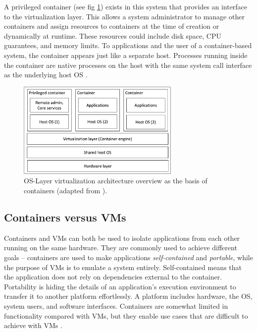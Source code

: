 A privileged container (see fig \ref{fig:OS-Layer-virtualization}) exists in this system that provides an interface to the virtualization layer. This allows a system administrator to manage other containers and assign resources to containers at the time of creation or dynamically at runtime. These resources could include disk space, CPU guarantees, and memory limits. To applications and the user of a container-based system, the container appears just like a separate host. Processes running inside the container are native processes on the host with the same system call interface as the underlying host OS \cite{Soltesz2007}\cite{Mouat99117185791205503}. 
\begin{figure}
  \centering
  \includegraphics[width=0.7\textwidth]{thesis/graphics/OS-layer-virtualization.png}
  \caption{OS-Layer virtualization architecture overview as the basis of containers (adapted from \cite{Sahoo2010}).}
  \label{fig:OS-Layer-virtualization}
\end{figure}

\subsection{Containers versus VMs}\label{containers-vs-VM}
Containers and VMs can both be used to isolate applications from each other running on the same hardware. They are commonly used to achieve different goals -- containers are used to make applications \emph{self-contained} and \emph{portable}, while the purpose of VMs is to emulate a system entirely. Self-contained means that the application does not rely on dependencies external to the container. Portability is hiding the details of an application's execution environment to transfer it to another platform effortlessly. A platform includes hardware, the OS, system users, and software interfaces. Containers are somewhat limited in functionality compared with VMs, but they enable use cases that are difficult to achieve with VMs \cite{Mouat99117185791205503}. 

